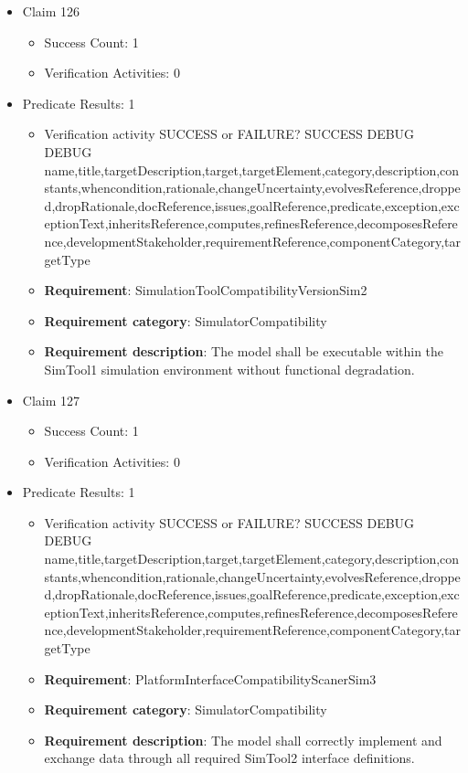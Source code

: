 \documentclass{article}
\begin{document}
\begin{itemize}
  				  \item Claim 126
				\begin{itemize}
			    	\item Success Count: 1 
			    	\item Verification Activities: 0
				\end{itemize}
				
									    
				\item Predicate Results: 1
					\begin{itemize}				
					\item Verification activity SUCCESS or FAILURE? SUCCESS
					DEBUG DEBUG name,title,targetDescription,target,targetElement,category,description,constants,whencondition,rationale,changeUncertainty,evolvesReference,dropped,dropRationale,docReference,issues,goalReference,predicate,exception,exceptionText,inheritsReference,computes,refinesReference,decomposesReference,developmentStakeholder,requirementReference,componentCategory,targetType
					\item \textbf{Requirement}: SimulationToolCompatibilityVersionSim2 
					\item \textbf{Requirement category}: SimulatorCompatibility
					\item \textbf{Requirement description}: The model shall be executable within the SimTool1 simulation environment without functional degradation.
					\end{itemize}

  				  \item Claim 127
				\begin{itemize}
			    	\item Success Count: 1 
			    	\item Verification Activities: 0
				\end{itemize}
				
									    
				\item Predicate Results: 1
					\begin{itemize}				
					\item Verification activity SUCCESS or FAILURE? SUCCESS
					DEBUG DEBUG name,title,targetDescription,target,targetElement,category,description,constants,whencondition,rationale,changeUncertainty,evolvesReference,dropped,dropRationale,docReference,issues,goalReference,predicate,exception,exceptionText,inheritsReference,computes,refinesReference,decomposesReference,developmentStakeholder,requirementReference,componentCategory,targetType
					\item \textbf{Requirement}: PlatformInterfaceCompatibilityScanerSim3 
					\item \textbf{Requirement category}: SimulatorCompatibility
					\item \textbf{Requirement description}: The model shall correctly implement and exchange data through all required SimTool2 interface definitions.
					\end{itemize}


\end{itemize}
\end{document}
